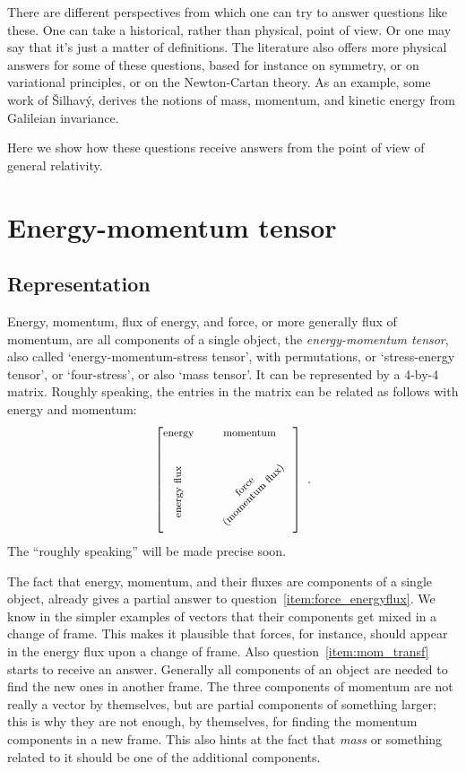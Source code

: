 \documentclass[\ifafour a4paper,12pt,\else a5paper,10pt,\fi%
onecolumn,oneside,article,%
british%
]{memoir}
\renewcommand*{\|}[1][]{\nonscript\:#1\vert\nonscript\:\mathopen{}}
\begin{document}
There are different perspectives from which one can try to answer questions like these. One can take a historical, rather than physical, point of view. Or one may say that it's just a matter of definitions. The literature also offers more physical answers for some of these questions, based for instance on symmetry, or on variational principles, or on the Newton-Cartan theory. As an example, some work of \v{S}ilhav\'y\autocites{silhavy1989,silhavy1992}[see also][]{serrin1995b_r1998}, derives the notions of mass, momentum, and kinetic energy from Galileian invariance.

Here we show how these questions receive answers from the point of view of general relativity.

\section{Energy-momentum tensor}
\label{sec:energy_momentum_tensor}

\subsection{Representation}
\label{sec:EMt_representation}

Energy, momentum, flux of energy, and force, or more generally flux of momentum, are all components of a single object, the \emph{energy-momentum tensor}, also called \enquote*{energy-momentum-stress tensor}, with permutations, or \enquote*{stress-energy tensor}, or \enquote*{four-stress}, or also \enquote*{mass tensor}. It can be represented by a 4-by-4 matrix. Roughly speaking, the entries in the matrix can be related as follows with energy and momentum:
\begin{equation}
  \label{eq:energy_momentum_entries}
  \begin{bmatrix}
    \text{\footnotesize energy} &
    \text{\footnotesize momentum} \\[2\jot]
    \rotatebox[origin=c]{90}{\text{\footnotesize energy flux}} &
    \rotatebox[origin=c]{45}{\parbox{8em}{\centering\footnotesize force\\ (momentum flux)}}
  \end{bmatrix} \ .
\end{equation}
The \enquote{roughly speaking} will be made precise soon.

The fact that energy, momentum, and their fluxes are components of a single object, already gives a partial answer to question~\ref{item:force_energyflux}. We know in the simpler examples of vectors that their components get mixed in a change of frame. This makes it plausible that forces, for instance, should appear in the energy flux upon a change of frame. Also question~\ref{item:mom_transf} starts to receive an answer. Generally all components of an object are needed to find the new ones in another frame. The three components of momentum are not really a vector by themselves, but are partial components of something larger; this is why they are not enough, by themselves, for finding the momentum components in a new frame. This also hints at the fact that \emph{mass} or something related to it should be one of the additional components.
\end{document}
